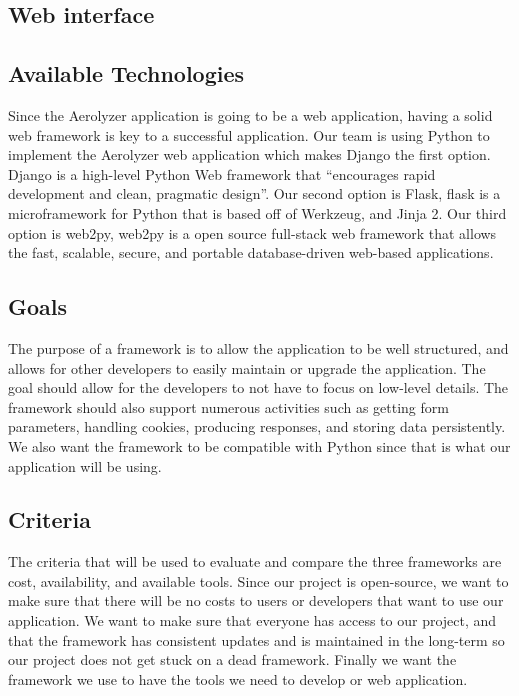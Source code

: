 \documentclass[letterpaper,10pt,draftclsnofoot,onecolumn]{IEEEtran}
\begin{document}
\begin{flushleft}
\section{Web interface}
\subsection{Available Technologies}
Since the Aerolyzer application is going to be a web application, having a solid web framework is  key to a successful application. Our team is using Python to implement the Aerolyzer web application which makes Django the first option. Django is a high-level Python Web framework that “encourages rapid development and clean, pragmatic design”\cite{10}. Our second option is Flask, flask is a microframework for Python that is based off of Werkzeug, and Jinja 2\cite{11}. Our third option is web2py, web2py is a open source full-stack web framework that allows the fast, scalable, secure, and portable database-driven web-based applications\cite{12}.


 


\subsection{Goals}
The purpose of a framework is to allow the application to be well structured, and allows for other developers to easily maintain or upgrade the application. The goal should allow for the developers to not have to focus on low-level details. The framework should also support numerous activities such as getting form parameters, handling cookies, producing responses, and storing data persistently\cite{13}. We also want the framework to be compatible with Python since that is what our application will be using. 





\subsection{Criteria}
The criteria that will be used to evaluate and compare the three frameworks are cost, availability, and available tools. Since our project is open-source, we want to make sure that there will be no costs to users or developers that want to use our application. We want to make sure that everyone has access to our project, and that the framework has consistent updates and is maintained in the long-term so our project does not get stuck on a dead framework. Finally we want the framework we use to have the tools we need to develop or web application.



\end{flushleft}
\end{document}
